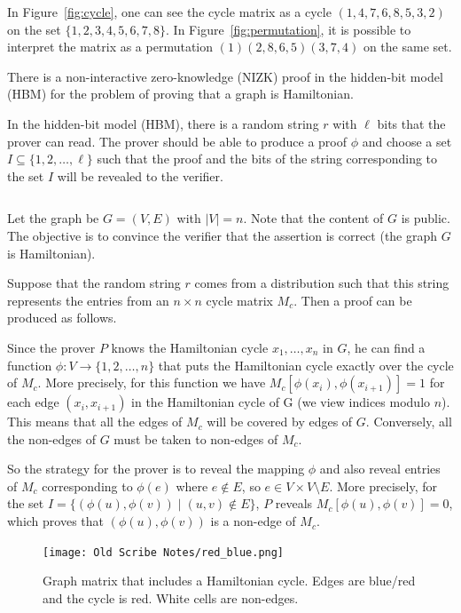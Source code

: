 \documentclass[12pt]{tufte-book}
\begin{document}
In Figure~\ref{fig:cycle}, one can see the cycle matrix as a cycle $(1,4,7,6,8,5,3,2)$
on the set $\{1,2,3,4,5,6,7,8\}$. In Figure~\ref{fig:permutation}, it is possible to
interpret the matrix as a permutation $(1)(2,8,6,5)(3,7,4)$ on the same set.

\begin{theorem}
There is a non-interactive zero-knowledge (NIZK) proof in the
hidden-bit model (HBM) for the problem of proving that a graph is Hamiltonian.
\end{theorem}
\proof
In the hidden-bit model (HBM), there is a random string $r$ with $\ell$ bits that the prover
can read. The prover should be able to produce a proof $\phi$ and choose a set
$I\subseteq\{1,2,\ldots,\ell\}$ such that the proof and the bits of the string corresponding to
the set $I$ will be revealed to the verifier.
\begin{table}[ht]
\centering
\begin{tabular}{r c l}
\end{tabular}
\end{table}


Let the graph be $G=(V,E)$ with $|V|=n$. Note that the content of $G$ is public.
The objective is to convince the verifier that the assertion is correct (the graph $G$
is Hamiltonian).

Suppose that the random string $r$ comes from a distribution
such that this string represents the entries from an $n\times n$ cycle matrix $M_c$.
Then a proof can be produced as follows.

Since the prover $P$ knows the Hamiltonian cycle $x_1,\ldots,x_n$ in $G$, he can find a
function $\phi:V\rightarrow \{1,2,\ldots,n\}$ that puts the Hamiltonian cycle exactly
over the cycle of $M_c$. More precisely, for this function we have
$M_c[\phi(x_i),\phi(x_{i+1})]=1$ for each edge $(x_i,x_{i+1})$ in the Hamiltonian cycle of G
(we view indices modulo $n$).
This means that all the edges of $M_c$ will be covered by edges of $G$. Conversely, all the
non-edges of $G$ must be taken to non-edges of $M_c$.

So the strategy for the prover is to reveal the mapping $\phi$ and also reveal entries of $M_c$ corresponding to $\phi(e)$ where $e \notin E$, so $e \in V \times V \setminus E$. More precisely, for the set
$I=\{(\phi(u),\phi(v)) \mid (u,v)\notin E\}$, $P$ reveals
$M_c[\phi(u),\phi(v)]=0$,
which proves that $(\phi(u),\phi(v))$ is a non-edge of $M_c$.

\begin{figure}[ht]
	\centering
		\texttt{[image: Old Scribe Notes/red\_blue.png]}
	\caption{Graph matrix that includes a Hamiltonian cycle. Edges are blue/red and the
                 cycle is red. White cells are non-edges.}
	\label{fig:red_blue}
\end{figure}
\end{document}
